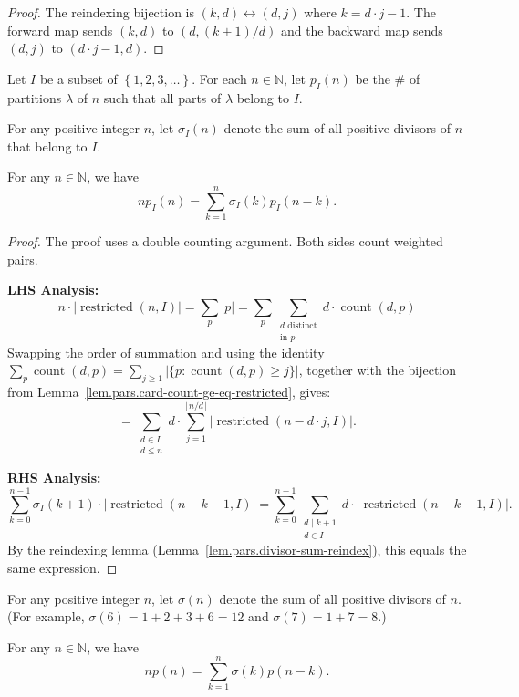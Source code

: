 \begin{proof}
The reindexing bijection is $(k, d) \leftrightarrow (d, j)$ where $k = d \cdot j - 1$.
The forward map sends $(k, d)$ to $(d, (k+1)/d)$ and the backward map sends $(d, j)$ to $(d \cdot j - 1, d)$.
\end{proof}

\begin{theorem}
\label{thm.pars.sigma1-I}
\leantarget
\leanok
Let $I$ be a subset of $\left\{  1,2,3,\ldots
\right\}  $. For each $n\in\mathbb{N}$, let $p_{I}\left(  n\right)  $ be the
\# of partitions $\lambda$ of $n$ such that all parts of $\lambda$ belong to
$I$.

For any positive integer $n$, let $\sigma_{I}\left(  n\right)  $ denote the
sum of all positive divisors of $n$ that belong to $I$.

For any $n\in\mathbb{N}$, we have%
\[
np_{I}\left(  n\right)  =\sum_{k=1}^{n}\sigma_{I}\left(  k\right)
p_{I}\left(  n-k\right)  .
\]
\end{theorem}

\begin{proof}
The proof uses a double counting argument. Both sides count weighted pairs.

\textbf{LHS Analysis:}
\[
n \cdot |{\operatorname{restricted}(n, I)}|
= \sum_{p} |p|
= \sum_{p} \sum_{\substack{d \text{ distinct}\\\text{in } p}} d \cdot \operatorname{count}(d, p)
\]
Swapping the order of summation and using the identity
$\sum_p \operatorname{count}(d, p) = \sum_{j \geq 1} |\{p : \operatorname{count}(d, p) \geq j\}|$,
together with the bijection from Lemma~\ref{lem.pars.card-count-ge-eq-restricted}, gives:
\[
= \sum_{\substack{d \in I \\ d \leq n}} d \cdot \sum_{j=1}^{\lfloor n/d \rfloor}
|\operatorname{restricted}(n - d \cdot j, I)|.
\]

\textbf{RHS Analysis:}
\[
\sum_{k=0}^{n-1} \sigma_I(k+1) \cdot |\operatorname{restricted}(n-k-1, I)|
= \sum_{k=0}^{n-1} \sum_{\substack{d \mid k+1 \\ d \in I}} d \cdot |\operatorname{restricted}(n-k-1, I)|.
\]
By the reindexing lemma (Lemma~\ref{lem.pars.divisor-sum-reindex}), this equals
the same expression.
\end{proof}

\begin{theorem}
\label{thm.pars.sigma1}
\leantarget
\leanok
For any positive integer $n$, let $\sigma\left(
n\right)  $ denote the sum of all positive divisors of $n$. (For example,
$\sigma\left(  6\right)  =1+2+3+6=12$ and $\sigma\left(  7\right)  =1+7=8$.)

For any $n\in\mathbb{N}$, we have%
\[
np\left(  n\right)  =\sum_{k=1}^{n}\sigma\left(  k\right)  p\left(
n-k\right)  .
\]
\end{theorem}


